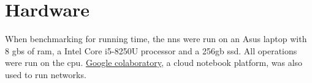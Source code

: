 
\section{Hardware}

When benchmarking for running time, the \gls{nn}s were run on an Asus laptop with 8 \gls{gb}s of \gls{ram}, a Intel Core i5-8250U processor and a 256\gls{gb} \gls{ssd}. All operations were run on the \gls{cpu}. \href{https://colab.research.google.com/}{Google colaboratory}, a cloud notebook platform, was also used to run networks.